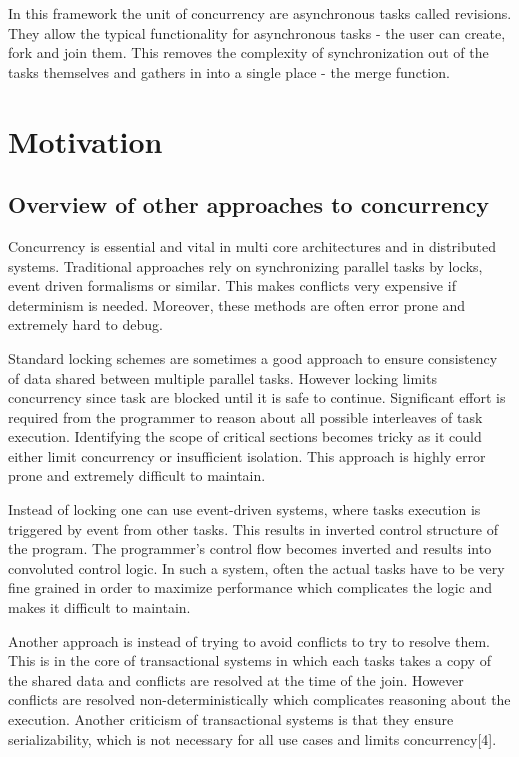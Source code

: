 \documentclass[12pt,twoside,notitlepage]{report}
\begin{document}
In this framework the unit of concurrency are asynchronous tasks called revisions. They allow the typical functionality for asynchronous tasks - the user can create, fork and join them. This removes the complexity of synchronization out of the tasks themselves and gathers in into a single place - the merge function. 

\section{Motivation}

\subsection{Overview of other approaches to concurrency}
 
Concurrency is essential and vital in multi core architectures and in distributed systems. Traditional approaches rely on synchronizing parallel tasks by locks, event driven formalisms or similar. This makes conflicts very expensive if determinism is needed. Moreover, these methods are often error prone and extremely hard to debug.

Standard locking schemes are sometimes a good approach to ensure consistency of data shared between multiple parallel tasks. However locking limits concurrency since task are blocked until it is safe to continue. Significant effort is required from the programmer to reason about all possible interleaves of task execution. Identifying the scope of critical sections becomes tricky as it could either limit concurrency or insufficient isolation. This approach is highly error prone and extremely difficult to maintain.

Instead of locking one can use event-driven systems, where tasks execution is triggered by event from other tasks.  This results in inverted control structure of the program. The programmer's control flow becomes inverted and results into convoluted control logic. In such a system, often the actual tasks have to be very fine grained in order to maximize performance which complicates the logic and makes it difficult to maintain.

Another approach is instead of trying to avoid conflicts to try to resolve them. This is in the core of transactional systems in which each tasks takes a copy of the shared data and conflicts are resolved at the time of the join. However conflicts are resolved non-deterministically which complicates reasoning about the execution. Another criticism of transactional systems is that they ensure serializability, which is not necessary for all use cases and limits concurrency[4].   
\end{document}
